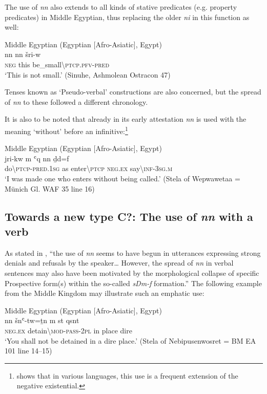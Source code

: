 \documentclass[output=paper]{langsci/langscibook}
\newcommand{\ꜥ}{ʿ}
\newcommand{\ꜣ}{\kern-.25pt\texttt{ꜣ}\kern-.6pt}
\begin{document}
The use of \textit{nn} also extends to all kinds of stative predicates (e.g. property predicates) in Middle Egyptian, thus replacing the older \textit{ni} in this function as well: 

\ea Middle Egyptian (Egyptian [Afro-Asiatic], Egypt) \label{ex:AE32}\\ 
    \gll nn nn šri-w \\
    \textsc{neg} this be\_small\textbackslash\textsc{ptcp.pfv-pred}\\ 
    \glt ‘This is not small.’ (Sinuhe, Ashmolean Ostracon 47)
\z 
 
Tenses known as ‘Pseudo-verbal’ constructions are also concerned, but the spread of \textit{nn} to these followed a different chronology. 
 
It is also to be noted that already in its early attestation \textit{nn} is used with the meaning ‘without’ before an infinitive:\footnote{\citet[118]{Veselinova2013} shows that in various languages, this use is a frequent extension of the negative existential.}

\ea Middle Egyptian (Egyptian [Afro-Asiatic], Egypt) \label{ex:AE33}\\ 
    \gll jri-kw m {\ꜥ}q nn ḏd=f \\
    do\textbackslash\textsc{ptcp-pred.1sg} as enter\textbackslash\textsc{ptcp} \textsc{neg.ex} say\textbackslash\textsc{inf-3sg.m}\\ 
    \glt ‘I was made one who enters without being called.’ (Stela of Wepwawetaa = Münich Gl. WAF 35 line 16) 
\z 

\subsection{Towards a new type C?: The use of \textit{nn} with a verb}\label{s:AE2-4}

As stated in \citet[258]{Loprieno-etal2017}, ``the use of \textit{nn} seems to have begun in utterances expressing strong denials and refusals by the speaker… However, the spread of \textit{nn} in verbal sentences may also have been motivated by the morphological collapse of specific Prospective form(s) within the so-called \textit{sDm-f} formation.''
The following example from the Middle Kingdom may illustrate such an emphatic use: 
 
\ea Middle Egyptian (Egyptian [Afro-Asiatic], Egypt) \label{ex:AE34}\\
    \gll nn šn{\ꜥ}-tw=ṯn m st qsnt \\
    \textsc{neg.ex} detain\textbackslash\textsc{mod-pass-2pl} in place dire\\ 
    \glt ‘You shall not be detained in a dire place.’ (Stela of Nebipusenwosret = BM EA 101 line 14–15) 
\z 
\end{document}

